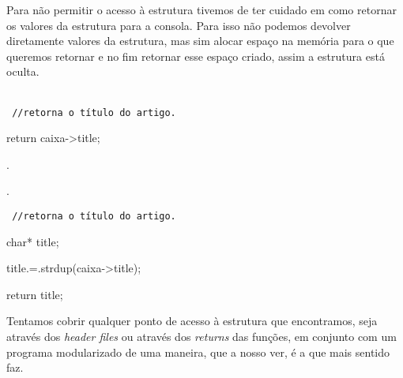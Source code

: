 \documentclass[a4paper,12pt]{report}
\begin{document}
Para não permitir o acesso à estrutura tivemos de ter cuidado em como retornar os valores da estrutura para a consola. Para isso não podemos devolver diretamente valores da estrutura, mas sim alocar espaço na memória para o que queremos retornar e no fim retornar esse espaço criado, assim a estrutura está oculta.
\\
\\
\begin{minipage}[t]{0.5\textwidth}
	\begin{tcolorbox}[colback={darkgray},title={\sf Endereço da estrutura transparente.}, outer arc=2mm, colupper=white]
{\footnotesize\tt	
	{\color{gray}//retorna o título do artigo.}
	
	{\color{newpink}return} caixa->{\color{deadred}title};
	
	{\color{darkgray}.}
	
	{\color{darkgray}.}
	
}
	\end{tcolorbox}
\end{minipage}
\begin{minipage}[t]{0.5\textwidth}
	\begin{tcolorbox}[colback={darkgray},title={\sf Endereço da estrutura oculto.}, outer arc=2mm, colupper=white]
{\footnotesize\tt
	{\color{gray}//retorna o título do artigo.}

	{\color{newpink}char*} title;
	
	title{\color{darkgray}.}{\color{newpink}=}{\color{darkgray}.}{\color{lightblue}strdup}(caixa->{\color{deadred}title});
	
	{\color{newpink}return} title;
	
}
	\end{tcolorbox}
	
\end{minipage}

Tentamos cobrir qualquer ponto de acesso à estrutura que encontramos, seja através dos {\sl header files} ou através dos {\sl returns} das funções, em conjunto com um programa modularizado de uma maneira, que a nosso ver, é a que mais sentido faz. 
\\
\end{document}
